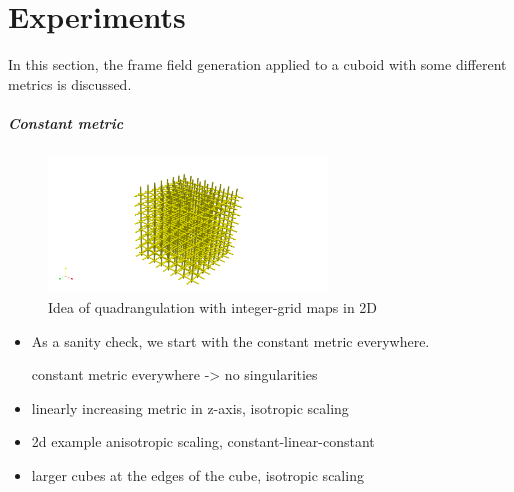 \documentclass[../thesis.tex]{subfiles}
\begin{document}
\chapter{Experiments}
\label{ch:experiments}
In this section, the frame field generation applied to a cuboid
with some different metrics is discussed.

\paragraph{Constant metric}
\begin{figure}[htb]
    \centering
    \includegraphics[width=20em]{figures/constant_metric}
    \caption{Idea of quadrangulation with integer-grid maps in 2D}
    \label{fig:constant-metric}
\end{figure}
\begin{itemize}
    \item As a sanity check, we start with the constant metric everywhere.
    
    
    
    constant metric everywhere -> no singularities
    \item linearly increasing metric in z-axis, isotropic scaling
    \item 2d example anisotropic scaling, constant-linear-constant
    \item larger cubes at the edges of the cube, isotropic scaling
\end{itemize}
\end{document}
